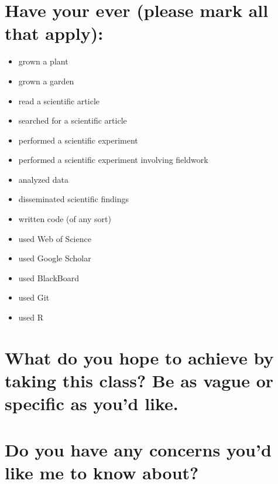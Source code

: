 \documentclass[12pt, notitlepage]{article}   	%
\def\wl{\par \vspace{\baselineskip}}
\begin{document}
{\section{Have your ever (please mark all that apply):}
\begin{itemize}
	\item{grown a plant \underline{\hspace{1cm}}}
	\item{grown a garden \underline{\hspace{1cm}}}
	\item{read a scientific article \underline{\hspace{1cm}}}
	\item{searched for a scientific article \underline{\hspace{1cm}}}
	\item{performed a scientific experiment \underline{\hspace{1cm}}}
	\item{performed a scientific experiment involving fieldwork \underline{\hspace{1cm}}}
	\item{analyzed data \underline{\hspace{1cm}}}
	\item{disseminated scientific findings \underline{\hspace{1cm}}}
	\item{written code (of any sort) \underline{\hspace{1cm}}}
	\item{used Web of Science \underline{\hspace{1cm}}}
	\item{used Google Scholar \underline{\hspace{1cm}}}
	\item{used BlackBoard \underline{\hspace{1cm}}}
	\item{used Git \underline{\hspace{1cm}}}
	\item{used R \underline{\hspace{1cm}}}
\end{itemize}

\newpage

\section{What do you hope to achieve by taking this class? 
Be as vague or specific as you'd like.}

\wl
\wl
\wl
\wl
\wl
\wl
\wl
\wl
\wl
\wl
\wl
\wl

\section{Do you have any concerns you'd like me to know about?}

} %
\end{document}
